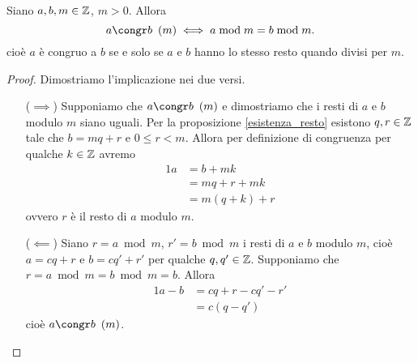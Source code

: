 \begin{theorem}  \label{equiv_congr_resto}
    Siano $a, b, m \in \mathbb{Z}$, $m > 0$. Allora
    \begin{equation}
        a \congr b \Mod{m} \iff a \bmod m = b \bmod m.
    \end{equation}
    cioè $a$ è congruo a $b$ se e solo se $a$ e $b$ hanno lo stesso resto quando divisi per $m$.
\end{theorem}
\begin{proof}
    Dimostriamo l'implicazione nei due versi.
    \begin{itemize}
        \item[($\implies$)]
        Supponiamo che $a \congr b \Mod{m}$ e dimostriamo che i resti di $a$ e $b$ modulo $m$ siano uguali.
        Per la proposizione \ref{esistenza_resto} esistono $q, r \in \mathbb{Z}$ tale che $b = mq + r$ e $0 \leq r < m$.
        Allora per definizione di congruenza per qualche $k \in \mathbb{Z}$ avremo
        \begin{alignat*}
            {1}
            a &= b + mk \\
            &= mq + r + mk \\
            &= m(q + k) + r
        \end{alignat*}
        ovvero $r$ è il resto di $a$ modulo $m$.
        \item[($\impliedby$)] Siano $r = a \bmod m$, $r' = b \bmod m$ i resti di $a$ e $b$ modulo $m$, cioè $a = cq + r$ e $b = cq' + r'$ per qualche $q, q' \in \mathbb{Z}$. Supponiamo che $r = a \bmod m = b \bmod m = b$. Allora
        \begin{alignat*}
            {1}
            a - b &= cq + r - cq' - r' \\
                &= c(q - q')
        \end{alignat*}
        cioè $a \congr b \Mod{m}$. \qedhere
        \end{itemize}
\end{proof}

